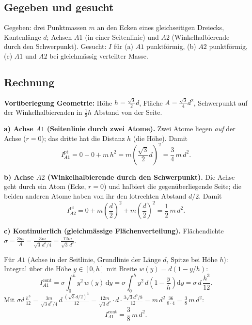 
\subsection*{Gegeben und gesucht}
Gegeben: drei Punktmassen $m$ an den Ecken eines gleichseitigen Dreiecks,
Kantenlänge $d$; Achsen $A1$ (in einer Seitenlinie) und $A2$
(Winkelhalbierende durch den Schwerpunkt).
Gesucht: $I$ für (a) $A1$ punktförmig, (b) $A2$ punktförmig, (c) $A1$ und $A2$
bei gleichmässig verteilter Masse.

\subsection*{Rechnung}
\textbf{Vorüberlegung Geometrie:} Höhe $h=\frac{\sqrt3}{2}d$, Fläche
$A=\frac{\sqrt3}{4}d^2$, Schwerpunkt auf der Winkelhalbierenden in
$\frac13 h$ Abstand von der Seite.

\textbf{a) Achse $A1$ (Seitenlinie durch zwei Atome).} Zwei Atome liegen
\emph{auf} der Achse ($r=0$); das dritte hat die Distanz $h$ (die Höhe). Damit
\begin{equation}
  I_{A1}^{\mathrm{pt}} = 0 + 0 + m\, h^2
  = m\left(\frac{\sqrt3}{2}d\right)^2
  = \frac34\, m\, d^2.
\end{equation}

\textbf{b) Achse $A2$ (Winkelhalbierende durch den Schwerpunkt).} Die Achse
geht durch ein Atom (Ecke, $r=0$) und halbiert die gegenüberliegende Seite; die
beiden anderen Atome haben von ihr den lotrechten Abstand $d/2$. Damit
\begin{equation}
  I_{A2}^{\mathrm{pt}} = 0 + m\left(\frac d2\right)^2 + m\left(\frac d2\right)^2
  = \frac12\, m\, d^2.
\end{equation}

\textbf{c) Kontinuierlich (gleichmässige Flächenverteilung).}
Flächendichte $\sigma = \frac{3m}{A}=\frac{3m}{\sqrt3\,d^2/4}=\frac{12m}{\sqrt3\,d^2}$.

Für $A1$ (Achse in der Seitlinie, Grundlinie der Länge $d$, Spitze bei Höhe $h$):
Integral über die Höhe $y\in[0,h]$ mit Breite $w(y)=d(1-y/h)$:
\begin{equation}
  I_{A1}^{\mathrm{cont}}
  = \sigma \int_0^h y^2\, w(y)\,\mathrm dy
  = \sigma \int_0^h y^2\, d\left(1-\frac yh\right)\mathrm dy
  = \sigma\, d\, \frac{h^3}{12}.
\end{equation}
Mit $\sigma d\,\frac{h^3}{12}=\frac{3m}{\sqrt3 d^2/4}\, d\,\frac{(\sqrt3 d/2)^3}{12}
=\frac{12m}{\sqrt3 d^2}\cdot d\cdot\frac{3\sqrt3 d^3/8}{12}
= m\,d^2\,\frac{36}{8\cdot 4}=\frac38\,m\,d^2$:
\begin{equation}
  I_{A1}^{\mathrm{cont}} = \frac38\, m\, d^2.
\end{equation}

